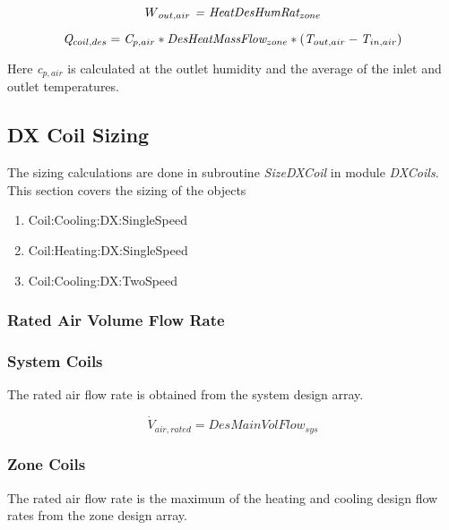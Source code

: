 \begin{equation}
W\emph{\(_{out,air}\) = HeatDesHumRat\(_{zone}\)}
\end{equation}

\begin{equation}
\emph{Q\(_{coil,des}\)} = \emph{C\(_{p,air}\)} * \emph{DesHeatMassFlow\(_{zone}\)} *(\emph{T\(_{out,air}\)}-\emph{T\(_{in,air}\)})
\end{equation}

Here \emph{c\(_{p,air}\)} is calculated at the outlet humidity and the average of the inlet and outlet temperatures.

\subsection{DX Coil Sizing}\label{dx-coil-sizing}

The sizing calculations are done in subroutine \emph{SizeDXCoil} in module \emph{DXCoils}. This section covers the sizing of the objects

\begin{enumerate}
\def\labelenumi{\arabic{enumi}.}
\item
  Coil:Cooling:DX:SingleSpeed
\item
  Coil:Heating:DX:SingleSpeed
\item
  Coil:Cooling:DX:TwoSpeed
\end{enumerate}

\subsubsection{Rated Air Volume Flow Rate}\label{rated-air-volume-flow-rate}

\subsubsection{System Coils}\label{system-coils-4}

The rated air flow rate is obtained from the system design array.

\begin{equation}
\dot V_{air,rated} = DesMainVolFlow_{sys}
\end{equation}

\subsubsection{Zone Coils}\label{zone-coils-4}

The rated air flow rate is the maximum of the heating and cooling design flow rates from the zone design array.

